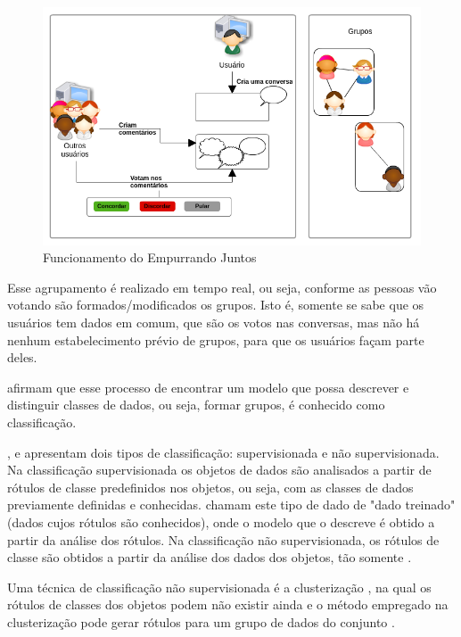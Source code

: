 \begin{figure}[h!]
\centering
\includegraphics[scale=0.6]{figuras/resumo_ej.png}
\caption{Funcionamento do Empurrando Juntos}
\label{fig:resumo_ej}
\end{figure}



Esse agrupamento é realizado em tempo real, ou seja, conforme as pessoas vão votando são formados/modificados
os grupos. Isto é, somente se sabe que os usuários tem dados em comum, que são os votos nas conversas,
mas não há nenhum estabelecimento prévio de grupos, para que os usuários façam parte deles. 

 afirmam que esse processo de encontrar um modelo que possa descrever e distinguir classes de dados, ou seja, formar 
grupos, é conhecido como classificação.

,  e  apresentam dois tipos de 
classificação: supervisionada e não supervisionada.
Na classificação supervisionada os objetos de dados são analisados a partir de rótulos de classe predefinidos nos objetos, ou seja, 
com as classes de dados previamente definidas e conhecidas.  chamam este tipo de dado de "dado treinado"
(dados cujos rótulos são conhecidos), onde o modelo que o descreve é obtido a partir da análise dos rótulos.
Na classificação não supervisionada, os rótulos de classe são obtidos a partir da análise dos dados dos objetos, tão somente \cite{tan2013data}.

Uma técnica de classificação não supervisionada é a clusterização \cite{clustering_review, tan2013data}, na qual os rótulos de classes dos objetos 
podem não existir ainda e o método empregado na clusterização pode gerar rótulos para um grupo de dados do conjunto \cite{han2011data}.

